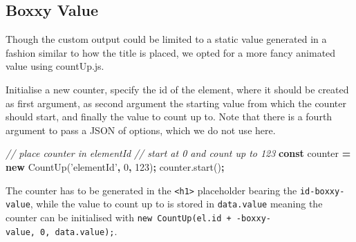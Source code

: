 \documentclass[10pt,]{krantz}
\makeatletter
\newenvironment{Shaded}{\begin{snugshade}}{\end{snugshade}}
\newcommand{\AttributeTok}[1]{\textcolor[rgb]{0.61,0.61,0.61}{#1}}
\newcommand{\CommentTok}[1]{\textcolor[rgb]{0.37,0.37,0.37}{\textit{#1}}}
\newcommand{\DecValTok}[1]{\textcolor[rgb]{0.06,0.06,0.06}{#1}}
\newcommand{\KeywordTok}[1]{\textcolor[rgb]{0.27,0.27,0.27}{\textbf{#1}}}
\newcommand{\NormalTok}[1]{#1}
\newcommand{\OperatorTok}[1]{\textcolor[rgb]{0.43,0.43,0.43}{\textbf{#1}}}
\newcommand{\StringTok}[1]{\textcolor[rgb]{0.5,0.5,0.5}{#1}}
\newcommand{\VariableTok}[1]{\textcolor[rgb]{0,0,0}{#1}}
\newenvironment{kframe}{%
\medskip{}
\setlength{\fboxsep}{.8em}
 \def\at@end@of@kframe{}%
 \ifinner\ifhmode%
  \def\at@end@of@kframe{\end{minipage}}%
  \begin{minipage}{\columnwidth}%
 \fi\fi%
 \def\FrameCommand##1{\hskip\@totalleftmargin \hskip-\fboxsep
 \colorbox{shadecolor}{##1}\hskip-\fboxsep
     \hskip-\linewidth \hskip-\@totalleftmargin \hskip\columnwidth}%
 \MakeFramed {\advance\hsize-\width
   \@totalleftmargin\z@ \linewidth\hsize
   \@setminipage}}%
 {\par\unskip\endMakeFramed%
 \at@end@of@kframe}
\renewenvironment{Shaded}{\begin{kframe}}{\end{kframe}}
\makeatother
\begin{document}
\hypertarget{shiny-output-boxxy-value}{%
\subsection{Boxxy Value}\label{shiny-output-boxxy-value}}

Though the custom output could be limited to a static value generated in a fashion similar to how the title is placed, we opted for a more fancy animated value using countUp.js.

Initialise a new counter, specify the id of the element, where it should be created as first argument, as second argument the starting value from which the counter should start, and finally the value to count up to. Note that there is a fourth argument to pass a JSON of options, which we do not use here.

\begin{Shaded}
\begin{Highlighting}[]
\CommentTok{// place counter in elementId}
\CommentTok{// start at 0 and count up to 123}
\KeywordTok{const}\NormalTok{ counter }\OperatorTok{=} \KeywordTok{new} \AttributeTok{CountUp}\NormalTok{(}\StringTok{'elementId'}\OperatorTok{,} \DecValTok{0}\OperatorTok{,} \DecValTok{123}\NormalTok{)}\OperatorTok{;}
\VariableTok{counter}\NormalTok{.}\AttributeTok{start}\NormalTok{()}\OperatorTok{;}
\end{Highlighting}
\end{Shaded}

The counter has to be generated in the \texttt{\textless{}h1\textgreater{}} placeholder bearing the \texttt{id-boxxy-value}, while the value to count up to is stored in \texttt{data.value} meaning the counter can be initialised with \texttt{new\ CountUp(el.id\ +\ \textquotesingle{}-boxxy-value\textquotesingle{},\ 0,\ data.value);}.
\end{document}
